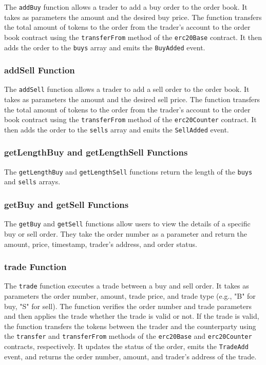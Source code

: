 The \texttt{addBuy} function allows a trader to add a buy order to the order book. It takes as parameters the amount and the desired buy price.
The function transfers the total amount of tokens to the order from the trader's account  to the order book contract using the \texttt{transferFrom}
method of the \texttt{erc20Base} contract. It then adds the order to the \texttt{buys} array and emits the \texttt{BuyAdded} event.

\subsubsection{addSell Function}


The \texttt{addSell} function allows a trader to add a sell order to the order book. It takes as parameters the amount and the desired sell price.
The function transfers the total amount of tokens to the order from the trader's account  to the order book contract using the \texttt{transferFrom}
method of the \texttt{erc20Counter} contract. It then adds the order to the \texttt{sells} array and emits the \texttt{SellAdded} event.


\subsubsection{getLengthBuy and getLengthSell Functions}


The \texttt{getLengthBuy} and \texttt{getLengthSell} functions return the length of the \texttt{buys} and \texttt{sells} arrays.


\subsubsection{getBuy and getSell Functions}


The \texttt{getBuy} and \texttt{getSell} functions allow users to view the details of a specific buy or sell order. They take the order number as a parameter and return the amount, price, timestamp, trader's address, and order status.


\subsubsection{trade Function}


The \texttt{trade} function executes a trade between a buy and sell order. It takes as parameters the order number, amount, trade price, and trade type (e.g., "B" for buy, "S" for sell). The function verifies the order number and trade parameters and then applies the trade whether the trade is valid or not.
If the trade is valid, the function transfers the tokens between the trader and the counterparty using the \texttt{transfer} and \texttt{transferFrom} methods of the \texttt{erc20Base} and \texttt{erc20Counter} contracts, respectively. It updates the status of the order, emits the \texttt{TradeAdd} event, and returns
the order number, amount, and trader's address of the trade.


